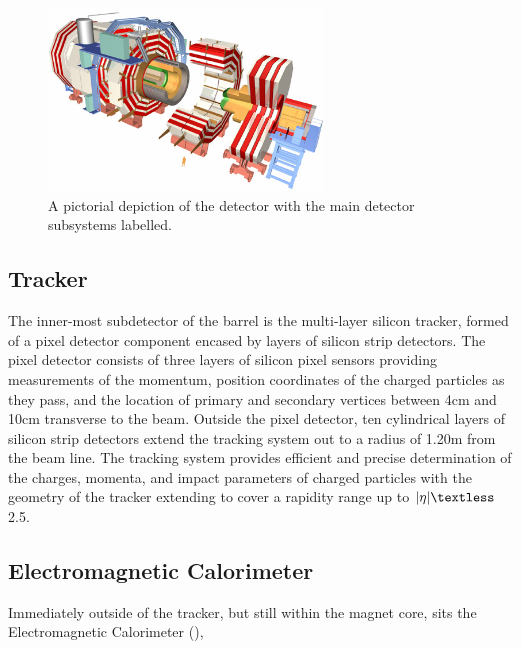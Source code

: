 \begin{figure}[!h]

\centering
\includegraphics[width=0.65\textwidth]{plots/cms-detector.png}
\caption[A pictorial depiction of the \CMS detector.]{A pictorial depiction of the \CMS detector with the main detector subsystems labelled.   \cite{cms-public-detector}}  
\label{fig:cms-detector}
\end{figure}

\subsection{Tracker}
\label{subsec:tracker}

 The inner-most subdetector of the barrel is the multi-layer silicon tracker, formed of a pixel detector component encased by layers of silicon strip detectors. The pixel detector consists of three layers of silicon pixel sensors providing measurements of the momentum, position coordinates of the charged particles as they pass, and the location of primary and secondary vertices between 4cm and 10cm transverse to the beam. Outside the pixel detector, ten cylindrical layers of silicon strip detectors extend the tracking system out to a radius of 1.20m from the beam line. The tracking system provides efficient and precise determination of the charges, momenta, and impact parameters of charged particles with the geometry of the tracker extending to cover a rapidity range up to $\lvert\eta\rvert \textless$ 2.5.  \\
 
\subsection{Electromagnetic Calorimeter}
\label{subsec:ecal}

 Immediately outside of the tracker, but still within the magnet core, sits the Electromagnetic Calorimeter (\ECAL),

